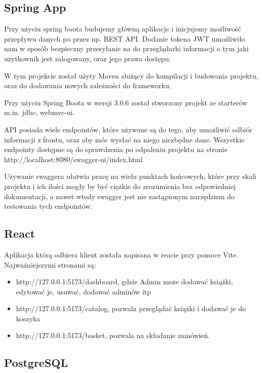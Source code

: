\documentclass[]{article}
\begin{document}
\subsection{Spring App}
Przy użyciu spring boota budujemy główną aplikacje i inicjujemy możliwość przepływu danych po przez np. REST API.
Dodanie tokena JWT umożliwiło nam w sposób bezpieczny przesyłanie na do przeglądarki informacji o tym jaki użytkownik jest zalogowany, oraz jego prawa dostępu.

W tym projekcie został użyty Maven służący do kompilacji i budowania projektu, oraz do dodawania nowych zależności do frameworku.

Przy użyciu Spring Boota w wersji 3.0.6 został stworzony projekt ze starterów m.in. jdbc, webmvc-ui.

API posiada wiele endpointów, które używane są do tego, aby umożliwić odbiór informacji z frontu, oraz aby móc wysłać na niego niezbędne dane.
Wszystkie endpointy dostępne są do sprawdzenia po odpaleniu projektu na stronie http://localhost:8080/swagger-ui/index.html


Używanie swaggera ułatwia pracę na wielu punktach końcowych, które przy skali projektu i ich ilości mogły by być ciężkie do zrozumienia bez odpowiedniej dokumentacji, a nawet wtedy swagger jest nie zastąpionym narzędziem do testowania tych endpointów.


\subsection{React}
Aplikacja którą odbiera klient została napisana w reacie przy pomoce Vite. Najważniejszymi stronami są:
\begin{itemize}
	\item http://127.0.0.1:5173/dashboard, gdzie Admin może dodawać książki, edytować je, usuwać, dodawać adminów itp 
	\item http://127.0.0.1:5173/catalog, pozwala przeglądać książki i dodawać je do koszyka
	\item http://127.0.0.1:5173/basket, pozwala na składanie zamówień.
\end{itemize}

\subsection{PostgreSQL}
\end{document}
